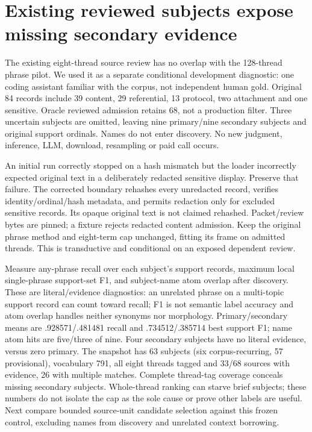 \documentclass[11pt]{article}
\begin{document}
\section{Existing reviewed subjects expose missing secondary evidence}
The existing eight-thread source review has no overlap with the 128-thread phrase
pilot. We used it as a separate conditional development diagnostic: one coding
assistant familiar with the corpus, not independent human gold. Original 84
records include 39 content, 29 referential, 13 protocol, two attachment and one
sensitive. Oracle reviewed admission retains 68, not a production filter. Three
uncertain subjects are omitted, leaving nine primary/nine secondary subjects and
original support ordinals. Names do not enter discovery. No new judgment,
inference, LLM, download, resampling or paid call occurs.

An initial run correctly stopped on a hash mismatch but the loader incorrectly
expected original text in a deliberately redacted sensitive display. Preserve
that failure. The corrected boundary rehashes every unredacted record, verifies
identity/ordinal/hash metadata, and permits redaction only for excluded sensitive
records. Its opaque original text is not claimed rehashed. Packet/review bytes
are pinned; a fixture rejects redacted content admission. Keep the original
phrase method and eight-term cap unchanged, fitting its frame on admitted
threads. This is transductive and conditional on an exposed dependent review.

Measure any-phrase recall over each subject's support records, maximum local
single-phrase support-set F1, and subject-name atom overlap after discovery.
These are literal/evidence diagnostics: an unrelated phrase on a multi-topic
support record can count toward recall; F1 is not semantic label accuracy and
atom overlap handles neither synonyms nor morphology. Primary/secondary means
are .928571/.481481 recall and .734512/.385714 best support F1; name atom
hits are five/three of nine. Four secondary subjects have no literal evidence,
versus zero primary. The snapshot has 63 subjects (six corpus-recurring,
57 provisional), vocabulary 791, all eight threads tagged and 33/68 sources
with evidence, 26 with multiple matches. Complete thread-tag coverage conceals
missing secondary subjects. Whole-thread ranking can starve brief subjects;
these numbers do not isolate the cap as the sole cause or prove other labels
are useful. Next compare bounded source-unit candidate selection against this
frozen control, excluding names from discovery and unrelated context borrowing.
\end{document}
